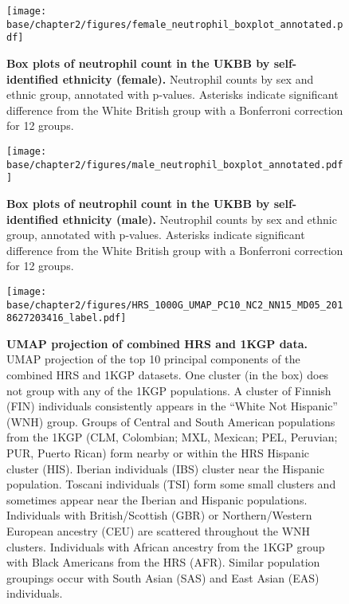 \newpage

\begin{figure}[ht]
    \centering
    \texttt{[image: base/chapter2/figures/female\_neutrophil\_boxplot\_annotated.pdf]}
    \caption[Box plots of neutrophil count in the UKBB by self-identified ethnicity (female)]{\textbf{Box plots of neutrophil count in the UKBB by self-identified ethnicity (female).} Neutrophil counts by sex and ethnic group, annotated with p-values. Asterisks indicate significant difference from the White British group with a Bonferroni correction for 12 groups.}
    \label{fig:supp_box_neutrophill_f}
\end{figure}

\newpage

\begin{figure}[ht]
    \centering
    \texttt{[image: base/chapter2/figures/male\_neutrophil\_boxplot\_annotated.pdf]}
    \caption[Box plots of neutrophil count in the UKBB by self-identified ethnicity (male)]{\textbf{Box plots of neutrophil count in the UKBB by self-identified ethnicity (male).} Neutrophil counts by sex and ethnic group, annotated with p-values. Asterisks indicate significant difference from the White British group with a Bonferroni correction for 12 groups.}
    \label{fig:supp_box_neutrophill_m}
\end{figure}

\newpage

\begin{figure}[ht]
    \centering
    \texttt{[image: base/chapter2/figures/HRS\_1000G\_UMAP\_PC10\_NC2\_NN15\_MD05\_2018627203416\_label.pdf]}
    \caption[UMAP projection of combined HRS and 1KGP data]{\textbf{UMAP projection of combined HRS and 1KGP data.} UMAP projection of the top 10 principal components of the combined HRS and 1KGP datasets. One cluster (in the box) does not group with any of the 1KGP populations. A cluster of Finnish (FIN) individuals consistently appears in the ``White Not Hispanic'' (WNH) group. Groups of Central and South American populations from the 1KGP (CLM, Colombian; MXL, Mexican; PEL, Peruvian; PUR, Puerto Rican) form nearby or within the HRS Hispanic cluster (HIS). Iberian individuals (IBS) cluster near the Hispanic population. Toscani individuals (TSI) form some small clusters and sometimes appear near the Iberian and Hispanic populations. Individuals with British/Scottish (GBR) or Northern/Western European ancestry (CEU) are scattered throughout the WNH clusters. Individuals with African ancestry from the 1KGP group with Black Americans from the HRS (AFR). Similar population groupings occur with South Asian (SAS) and East Asian (EAS) individuals.}
    \label{fig:supp_hrs_1000g}
\end{figure}

